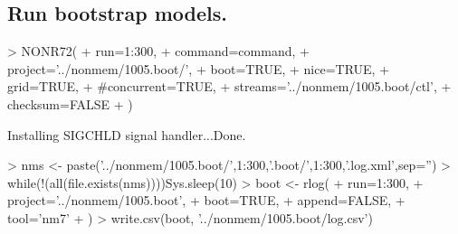 \subsection{Run bootstrap models.}
\begin{Schunk}
\begin{Sinput}
> NONR72(
+      run=1:300,
+      command=command,
+      project='../nonmem/1005.boot/',
+      boot=TRUE,
+      nice=TRUE,
+      grid=TRUE,
+      #concurrent=TRUE,
+      streams='../nonmem/1005.boot/ctl',
+      checksum=FALSE
+ )
\end{Sinput}
\begin{Soutput}
Installing SIGCHLD signal handler...Done.
\end{Soutput}
\begin{Sinput}
> nms <- paste('../nonmem/1005.boot/',1:300,'.boot/',1:300,'.log.xml',sep='')
> while(!(all(file.exists(nms))))Sys.sleep(10)
> boot <- rlog(
+ 	run=1:300,
+ 	project='../nonmem/1005.boot',
+ 	boot=TRUE,
+ 	append=FALSE,
+ 	tool='nm7'
+ )
> write.csv(boot, '../nonmem/1005.boot/log.csv')  
\end{Sinput}
\end{Schunk}

